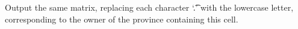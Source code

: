 Output the same matrix, replacing each character `\t{.}' with the lowercase letter, corresponding to the owner of the province containing this cell.